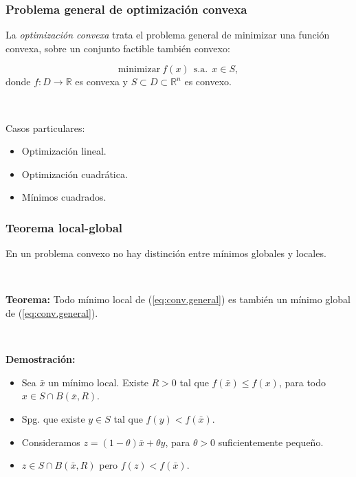\documentclass{beamer}
\begin{document}
\begin{frame}
\frametitle{Problema general de optimización convexa}

La \textit{optimización convexa} trata el problema general de minimizar una función convexa, sobre un conjunto factible también convexo:




\begin{equation}
\label{eq:conv.general}
\mbox{minimizar} \  f(x) \ \ \mbox{s.a.} \ \ x\in S, 
\end{equation}
donde $f:D\to\mathbb{R}$ es convexa y $S\subset D\subset \mathbb{R}^n$ es convexo. 

\

Casos particulares:
\begin{itemize}
\item Optimización lineal.
\item Optimización cuadrática.
\item Mínimos cuadrados.
\end{itemize}

\end{frame}
\begin{frame}
\frametitle{Teorema local-global}

En un problema convexo no hay distinción entre mínimos globales y locales.

\

{\bf Teorema:} Todo mínimo local de (\ref{eq:conv.general}) es también un mínimo global de (\ref{eq:conv.general}).

\

{\scriptsize
{\bf Demostración:}

\begin{itemize}
\item Sea $\bar{x}$ un mínimo local. Existe $R>0$ tal que $f(\bar{x})\leq f(x)$, para todo $x\in S\cap B(\bar{x}, R)$.
\item Spg. que existe $y\in S$ tal que $f(y)<f(\bar{x})$.
\item Consideramos $z=(1-\theta)\bar{x} + \theta y$, para $\theta > 0$ suficientemente pequeño. 
\item $z\in S\cap B(\bar{x}, R)$ pero $f(z)<f(\bar{x})$. 
\end{itemize}
}

\end{frame}
\end{document}
